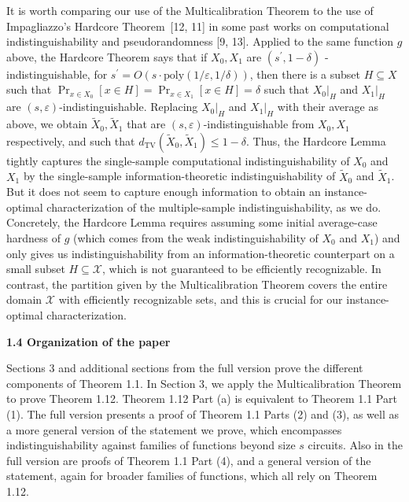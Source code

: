 \documentclass[10pt,a4paper]{article}
\begin{document}
It is worth comparing our use of the Multicalibration Theorem to the use of Impagliazzo’s Hardcore Theorem [12, 11] in some past works on computational indistinguishability and pseudorandomness [9, 13]. Applied to the same function $g$ above, the Hardcore Theorem says that if $X_{0},X_{1}$ are $(s^{\prime},1-\delta)$
-indistinguishable, for $s^{\prime}=O(s\cdot\mathrm{poly}(1/\varepsilon,1/\delta))$, then there is a subset $H\subseteq X$ such that $\Pr_{x\in X_{0}}[x\in H]=\Pr_{x\in X_{1}}[x\in H]=\delta$ such that $X_{0}|_{H}$ and $X_{1}|_{H}$ are $(s,\varepsilon)$-indistinguishable. Replacing $X_{0}|_{H}$ and $X_{1}|_{H}$ with their average as above, we obtain $\widetilde{X}_{0},\widetilde{X}_{1}$ that are $(s,\varepsilon)$-indistinguishable from $X_{0},X_{1}$ respectively, and such that $d_{\mathrm{TV}}(\widetilde{X}_{0},\widetilde{X}_{1})\leq 1-\delta.$ Thus, the Hardcore Lemma tightly captures the single-sample computational indistinguishability of $X_{0}$ and $X_{1}$ by the single-sample information-theoretic indistinguishability of $\widetilde{X}_{0}$ and $\widetilde{X}_{1}$. But it does not seem to capture enough information to obtain an instance-optimal characterization of the multiple-sample indistinguishability, as we do. Concretely, the Hardcore Lemma requires assuming some initial average-case hardness of $g$ (which comes from the weak indistinguishability of $X_{0}$ and $X_{1}$) and only gives us indistinguishability from an information-theoretic counterpart on a small subset $H\subseteq\mathcal{X}$, which is not guaranteed to be efficiently recognizable. In contrast, the partition given by the Multicalibration Theorem covers the entire domain $\mathcal{X}$ with efficiently recognizable sets, and this is crucial for our instance-optimal characterization.\par






\par\medskip\noindent\textbf{
1.4 Organization of the paper}\par




Sections 3 and additional sections from the full version prove the different components of Theorem 1.1. In Section 3, we apply the Multicalibration Theorem to prove Theorem 1.12. Theorem 1.12 Part (a) is equivalent to Theorem 1.1 Part (1). The full version presents a proof of Theorem 1.1 Parts (2) and (3), as well as a more general version of the statement we prove, which encompasses indistinguishability against families of functions beyond size $s$ circuits. Also in the full version are proofs of Theorem 1.1 Part (4), and a general version of the statement, again for broader families of functions, which all rely on Theorem 1.12.\par
\end{document}
